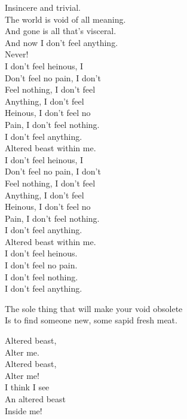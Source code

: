 Insincere and trivial. \\
The world is void of all meaning. \\
And gone is all that's visceral. \\
And now I don't feel anything. \\
Never! \\

I don't feel heinous, I \\
Don't feel no pain, I don't \\
Feel nothing, I don't feel \\
Anything, I don't feel \\
Heinous, I don't feel no \\
Pain, I don't feel nothing. \\
I don't feel anything. \\
Altered beast within me. \\

I don't feel heinous, I \\
Don't feel no pain, I don't \\
Feel nothing, I don't feel \\
Anything, I don't feel \\
Heinous, I don't feel no \\
Pain, I don't feel nothing. \\
I don't feel anything. \\
Altered beast within me. \\

I don't feel heinous. \\
I don't feel no pain. \\
I don't feel nothing. \\
I don't feel anything. \\


The sole thing that will make your void obsolete \\
Is to find someone new, some sapid fresh meat. \\


Altered beast, \\
Alter me. \\
Altered beast, \\
Alter me! \\

I think I see \\
An altered beast \\
Inside me! \\

